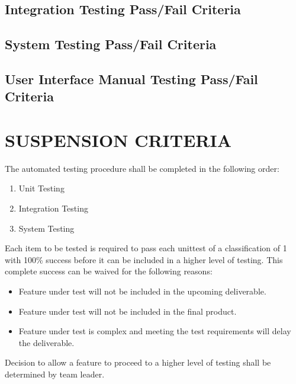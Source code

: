 \documentclass[report]{article}
\newcounter{rc}
\begin{document}
\newcommand{\first}{.5cm}
\newcommand{\second}{4.5cm}
\newcommand{\third}{4.5cm}
\newcommand{\fourth}{4.5cm}


\newpage


\subsection{Integration Testing Pass/Fail Criteria}


\newpage

\newpage

\newpage

\newpage

\newpage

\newpage

\newpage

\newpage

\newpage

\newpage

\newpage


\newpage


\subsection{System Testing Pass/Fail Criteria}

%

\subsection{User Interface Manual Testing Pass/Fail Criteria}

%

\section[SUSPENSION CRITERIA]{SUSPENSION CRITERIA}
The automated testing procedure shall be completed in the following order:
\begin{enumerate}
\item Unit Testing
\item Integration Testing
\item System Testing
\end{enumerate}
Each item to be tested is required to pass each unittest of a classification of 1 with 100\% success before it can be included in a higher level of testing. This complete success can be waived for the following reasons:
\begin{itemize}
\item Feature under test will not be included in the upcoming deliverable.
\item Feature under test will not be included in the final product.
\item Feature under test is complex and meeting the test requirements will delay the deliverable.
\end{itemize}
Decision to allow a feature to proceed to a higher level of testing shall be determined by team leader.
\end{document}
